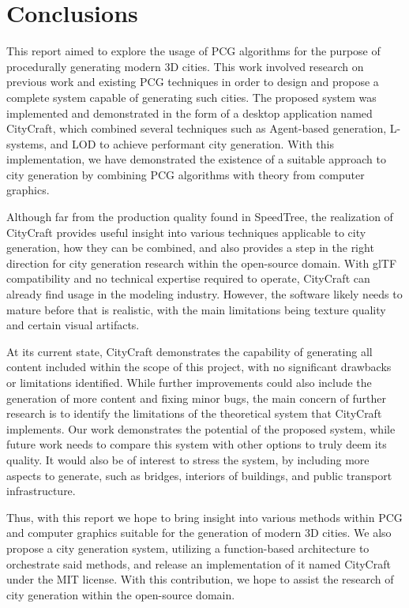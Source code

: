 \chapter{Conclusions}

This report aimed to explore the usage of PCG algorithms for the purpose of procedurally generating modern 3D cities.
This work involved research on previous work and existing PCG techniques in order to design and propose a complete system capable of generating such cities.
The proposed system was implemented and demonstrated in the form of a desktop application named CityCraft, which combined several techniques such as Agent-based generation, L-systems, and LOD to achieve performant city generation.
With this implementation, we have demonstrated the existence of a suitable approach to city generation by combining PCG algorithms with theory from computer graphics.

Although far from the production quality found in SpeedTree, the realization of CityCraft provides useful insight into various techniques applicable to city generation, how they can be combined, and also provides a step in the right direction for city generation research within the open-source domain.
With glTF compatibility and no technical expertise required to operate, CityCraft can already find usage in the modeling industry.
However, the software likely needs to mature before that is realistic, with the main limitations being texture quality and certain visual artifacts.

At its current state, CityCraft demonstrates the capability of generating all content included within the scope of this project, with no significant drawbacks or limitations identified.
While further improvements could also include the generation of more content and fixing minor bugs, the main concern of further research is to identify the limitations of the theoretical system that CityCraft implements.
Our work demonstrates the potential of the proposed system, while future work needs to compare this system with other options to truly deem its quality.
It would also be of interest to stress the system, by including more aspects to generate, such as bridges, interiors of buildings, and public transport infrastructure.

Thus, with this report we hope to bring insight into various methods within PCG and computer graphics suitable for the generation of modern 3D cities.
We also propose a city generation system, utilizing a function-based architecture to orchestrate said methods, and release an implementation of it named CityCraft under the MIT license.
With this contribution, we hope to assist the research of city generation within the open-source domain.